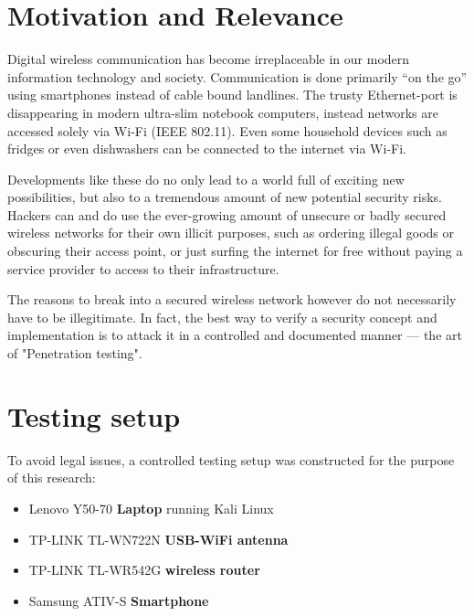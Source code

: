 \section{Motivation and Relevance}

Digital wireless communication has become irreplaceable in our modern information technology and society. Communication is done primarily “on the go” using smartphones instead of cable bound landlines. The trusty Ethernet-port is disappearing in modern ultra-slim notebook computers, instead networks are accessed solely via Wi-Fi (IEEE 802.11). Even some household devices such as fridges or even dishwashers can be connected to the internet via Wi-Fi.

Developments like these do no only lead to a world full of exciting new possibilities, but also to a tremendous amount of new potential security risks. Hackers can and do use the ever-growing amount of unsecure or badly secured wireless networks for their own illicit purposes, such as ordering illegal goods or obscuring their access point, or just surfing the internet for free without paying a service provider to access to their infrastructure.  

The reasons to break into a secured wireless network however do not necessarily have to be illegitimate. In fact, the best way to verify a security concept and implementation is to attack it in a controlled and documented manner --- the art of "Penetration testing".

\section{Testing setup}

To avoid legal issues, a controlled testing setup was constructed for the purpose of this research:

\begin{itemize}

\item{Lenovo Y50-70 \textbf{Laptop} running Kali Linux \cite{Kali17}}

\item{TP-LINK TL-WN722N \textbf{USB-WiFi antenna}}

\item{TP-LINK TL-WR542G \textbf{wireless router}}

\item{Samsung ATIV-S \textbf{Smartphone}}

\end{itemize}

